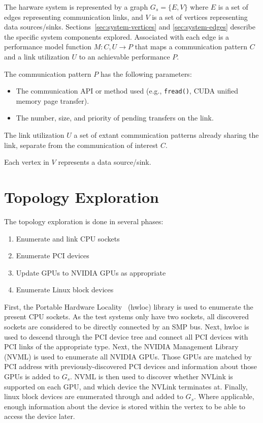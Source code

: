 The harware system is represented by a graph $G_s = \{E,V\}$ where $E$ is a set of edges representing communication links, and $V$ is a set of vertices representing data sources/sinks.
Sections~\ref{sec:system-vertices} and \ref{sec:system-edges} describe the specific system components explored.
Associated with each edge is a performance model function $M: C,U \rightarrow P$ that maps a communication pattern $C$ and a link utilization $U$ to an achievable performance $P$.

The communication pattern $P$ has the following parameters:
\begin{itemize}
    \item The communication API or method used (e.g., \texttt{fread()}, CUDA unified memory page transfer).
    \item The number, size, and priority of pending transfers on the link.
\end{itemize}

The link utilization $U$ a set of extant communication patterns already sharing the link, separate from the communication of interest $C$.



Each vertex in $V$ represents a data source/sink.



%
%
\section{Topology Exploration}
\label{sec:topology-exploration}

The topology exploration is done in several phases:

\begin{minipage}[ht]{\textwidth}
\begin{enumerate}
    \item Enumerate and link CPU sockets
    \item Enumerate PCI devices
    \item Update GPUs to NVIDIA GPUs as appropriate
    \item Enumerate Linux block devices
\end{enumerate}
\end{minipage}

First, the Portable Hardware Locality~\cite{broquedis2010hwloc} (hwloc) library is used to enumerate the present CPU sockets.
As the test systems only have two sockets, all discovered sockets are considered to be directly connected by an SMP bus.
Next, hwloc is used to descend through the PCI device tree and connect all PCI devices with PCI links of the appropriate type.
Next, the NVIDIA Management Library~\cite{nvidia2017nvml} (NVML) is used to enumerate all NVIDIA GPUs.
Those GPUs are matched by PCI address with previously-discovered PCI devices and information about those GPUs is added to $G_s$.
NVML is then used to discover whether NVLink is supported on each GPU, and which device the NVLink terminates at.
Finally, linux block devices are enumerated through  and added to $G_s$.
Where applicable, enough information about the device is stored within the vertex to be able to access the device later.

